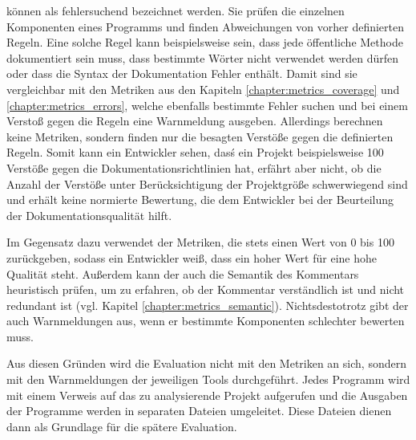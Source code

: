\checkpmd können als fehlersuchend bezeichnet werden. Sie prüfen die einzelnen Komponenten eines Programms und finden Abweichungen von vorher definierten Regeln. Eine solche Regel kann beispielsweise sein, dass jede öffentliche Methode dokumentiert sein muss, dass bestimmte Wörter nicht verwendet werden dürfen oder dass die Syntax der Dokumentation Fehler enthält. Damit sind sie vergleichbar mit den Metriken aus den Kapiteln \ref{chapter:metrics_coverage}  und \ref{chapter:metrics_errors}, welche ebenfalls bestimmte Fehler suchen und bei einem Verstoß gegen die Regeln eine Warnmeldung ausgeben. Allerdings berechnen \checkpmd keine Metriken, sondern finden nur die besagten Verstöße gegen die definierten Regeln. Somit kann ein Entwickler sehen, dasś ein Projekt beispielsweise 100 Verstöße gegen die Dokumentationsrichtlinien hat, erfährt aber nicht, ob die Anzahl der Verstöße unter Berücksichtigung der Projektgröße schwerwiegend sind und erhält keine normierte Bewertung, die dem Entwickler bei der Beurteilung der Dokumentationsqualität hilft. 

Im Gegensatz dazu verwendet der \doceval Metriken, die stets einen Wert von 0 bis 100 zurückgeben, sodass ein Entwickler weiß, dass ein hoher Wert für eine hohe Qualität steht. Außerdem kann der \doceval auch die Semantik des Kommentars heuristisch prüfen, um zu erfahren, ob der Kommentar verständlich ist und nicht redundant ist (vgl. Kapitel \ref{chapter:metrics_semantic}). Nichtsdestotrotz gibt der \doceval auch Warnmeldungen aus, wenn er bestimmte Komponenten schlechter bewerten muss.

Aus diesen Gründen wird die Evaluation nicht mit den Metriken an sich, sondern mit den Warnmeldungen der jeweiligen Tools durchgeführt. Jedes Programm wird mit einem Verweis auf das zu analysierende Projekt aufgerufen und die Ausgaben der Programme werden in separaten Dateien umgeleitet.  Diese Dateien dienen dann als Grundlage für die spätere Evaluation. 

